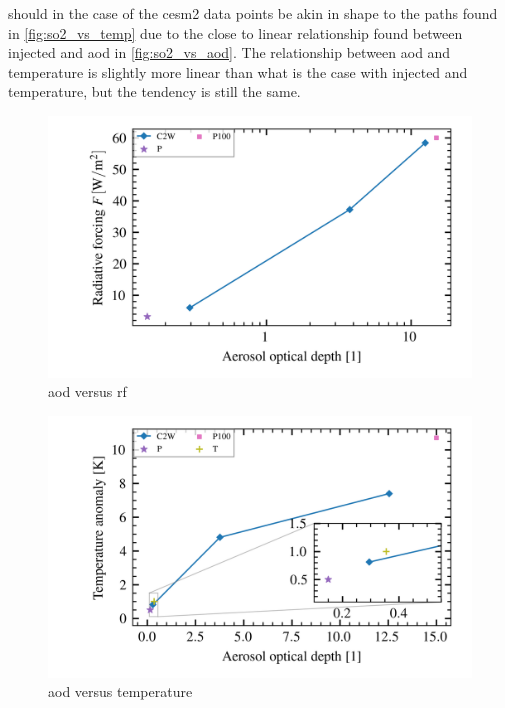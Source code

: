 \documentclass{ametsocV5}
\newcommand{\iso}[1][i]{{#1}njected \ce{SO2}}
\begin{document}
 should in the case of the \ac{cesm2} data points be akin in shape
to the paths found in \cref{fig:so2_vs_temp} due to the close to linear relationship
found between \iso{} and \ac{aod} in \cref{fig:so2_vs_aod}. The relationship between
\ac{aod} and temperature is slightly more linear than what is the case with \iso{} and
temperature, but the tendency is still the same.

\begin{figure}[t]
  \centering
  \includegraphics[width=0.95\linewidth]{figures/aod_vs_toa_logscale.png}
  \caption{\ac{aod} versus \ac{rf}}%
  \label{fig:aod_vs_toa_logscale}
\end{figure}

\begin{figure}[t]
  \begin{center}
    \includegraphics[width=0.95\linewidth]{figures/aod_vs_temperature.png}
  \end{center}
  \caption{\ac{aod} versus temperature}%
  \label{fig:aod_vs_temp}
\end{figure}
\end{document}
